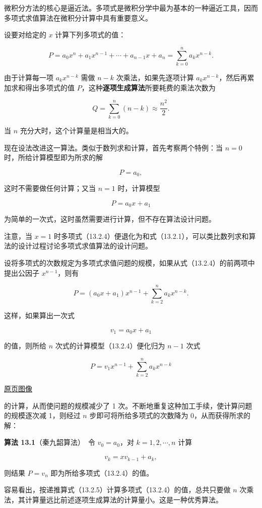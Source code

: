 \documentclass[
  10pt,
  fontset=fandol]{ctexart}
\begin{document}
微积分方法的核心是逼近法。多项式是微积分学中最为基本的一种逼近工具，因而多项式求值算法在微积分计算中具有重要意义。

设要对给定的 \(x\) 计算下列多项式的值：

\[
P=a_0x^n+a_1x^{n-1}+\cdots+a_{n-1}x+a_n
=\sum_{k=0}^{n}a_kx^{n-k}.
\tag{13.2.4}
\]

由于计算每一项 \(a_kx^{n-k}\) 需做 \(n-k\) 次乘法，如果先逐项计算 \(a_kx^{n-k}\)，然后再累加求和得出多项式的值 \(P\)，这种\textbf{逐项生成算法}所要耗费的乘法次数为

\[
Q=\sum_{k=0}^{n}(n-k)\approx\frac{n^2}{2}.
\]

当 \(n\) 充分大时，这个计算量是相当大的。

现在设法改进这一算法。类似于数列求和计算，首先考察两个特例：当 \(n=0\) 时，所给计算模型即为所求的解

\[
P=a_0,
\]

这时不需要做任何计算；又当 \(n=1\) 时，计算模型

\[
P=a_0x+a_1
\]

为简单的一次式，这时虽然需要进行计算，但不存在算法设计问题。

注意，当 \(x=1\) 时多项式（13.2.4）便退化为和式（13.2.1），可以类比数列求和算法的设计过程讨论多项式求值算法的设计问题。

设将多项式的次数规定为多项式求值问题的规模，如果从式（13.2.4）的前两项中提出公因子 \(x^{n-1}\)，则有

\[
P=(a_0x+a_1)x^{n-1}+\sum_{k=2}^{n}a_kx^{n-k}.
\]

这样，如果算出一次式

\[
v_1=a_0x+a_1
\]

的值，则所给 \(n\) 次式的计算模型（13.2.4）便化归为 \(n-1\) 次式

\[
P=v_1x^{n-1}+\sum_{k=2}^{n}a_kx^{n-k}
\]

\href{../../source-images/pdf-311.jpeg}{原页图像}

的计算，从而使问题的规模减少了 1 次。不断地重复这种加工手续，使计算问题的规模逐次减 1，则经过 \(n\) 步即可将所给多项式的次数降为 0，从而获得所求的解：

\textbf{算法 13.1}（秦九韶算法）　令 \(v_0=a_0\)，对 \(k=1,2,\cdots,n\) 计算

\[
v_k=xv_{k-1}+a_k,
\tag{13.2.5}
\]

则结果 \(P=v_n\) 即为所给多项式（13.2.4）的值。

容易看出，按递推算式（13.2.5）计算多项式（13.2.4）的值，总共只要做 \(n\) 次乘法，其计算量远比前述逐项生成算法的计算量小。这是一种优秀算法。
\end{document}
